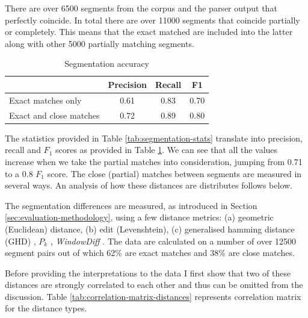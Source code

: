     There are over 6500 segments from the corpus and the parser output that perfectly coincide. In total there are over 11000 segments that coincide partially or completely. This means that the exact matched are included into the latter along with other 5000 partially matching segments. 
    
    \begin{table}[!ht]
    \centering
    \begin{tabular}{lccc}
    \toprule
    {} &  Precision &  Recall &   F1 \\
    \midrule
    Exact matches only &        0.61 &    0.83 & 0.70 \\
    Exact and close matches                &        0.72 &    0.89 & 0.80 \\
    \bottomrule
    \end{tabular}
    \caption{Segmentation accuracy}
    \label{tab:segmentation-accuracy}
    \end{table}
    
    The statistics provided in Table \ref{tab:segmentation-stats} translate into precision, recall and $F_1$ scores as provided in Table \ref{tab:segmentation-accuracy}. We can see that all the values increase when we take the partial matches into consideration, jumping from 0.71 to a 0.8 $F_1$ score. The close (partial) matches between segments are measured in several ways. An analysis of how these distances are distributes follows below. 
    
    The segmentation differences are measured, as introduced in Section \ref{sec:evaluation-methodology}, using a few distance metrics: (a) geometric (Euclidean) distance, (b) edit (Levenshtein), (c) generalised hamming distance (GHD) \citep{Bookstein2002}, $P_k$ \citep[198--200]{beeferman1999statistical}, \textit{WindowDiff} \citep[10]{pevzner2002critique}. 
    The data are calculated on a number of over 12500 segment pairs out of which 62\% are exact matches and 38\% are close matches. 
    
    Before providing the interpretations to the data I first show that two of these distances are strongly correlated to each other and thus can be omitted from the discussion. Table \ref{tab:correlation-matrix-distances} represents correlation matrix for the distance types. 
    

